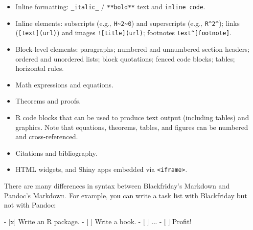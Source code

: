 \documentclass[12pt,]{krantz}
\makeatletter
\newenvironment{Shaded}{\begin{snugshade}}{\end{snugshade}}
\newcommand{\FloatTok}[1]{\textcolor[rgb]{0.00,0.00,0.81}{#1}}
\newcommand{\NormalTok}[1]{#1}
\newenvironment{kframe}{%
\medskip{}
\setlength{\fboxsep}{.8em}
 \def\at@end@of@kframe{}%
 \ifinner\ifhmode%
  \def\at@end@of@kframe{\end{minipage}}%
  \begin{minipage}{\columnwidth}%
 \fi\fi%
 \def\FrameCommand##1{\hskip\@totalleftmargin \hskip-\fboxsep
 \colorbox{shadecolor}{##1}\hskip-\fboxsep
     \hskip-\linewidth \hskip-\@totalleftmargin \hskip\columnwidth}%
 \MakeFramed {\advance\hsize-\width
   \@totalleftmargin\z@ \linewidth\hsize
   \@setminipage}}%
 {\par\unskip\endMakeFramed%
 \at@end@of@kframe}
\renewenvironment{Shaded}{\begin{kframe}}{\end{kframe}}
\theoremstyle{definition}
\theoremstyle{definition}
\theoremstyle{definition}
\theoremstyle{remark}
\makeatother
\begin{document}
\begin{enumerate}
  \begin{itemize}
  \item
    Inline formatting: \texttt{\_italic\_} / \texttt{**bold**} text and
    \texttt{\textasciigrave{}inline\ code\textasciigrave{}}.
  \item
    Inline elements: subscripts (e.g.,
    \texttt{H\textasciitilde{}2\textasciitilde{}0}) and superscripts
    (e.g., \texttt{R\^{}2\^{}}); links (\texttt{{[}text{]}(url)}) and
    images \texttt{!{[}title{]}(url)}; footnotes
    \texttt{text\^{}{[}footnote{]}}.
  \item
    Block-level elements: paragraphs; numbered and unnumbered section
    headers; ordered and unordered lists; block quotations; fenced code
    blocks; tables; horizontal rules.
  \item
    Math expressions and equations.
  \item
    Theorems and proofs.
  \item
    R code blocks that can be used to produce text output (including
    tables) and graphics. Note that equations, theorems, tables, and
    figures can be numbered and cross-referenced.
  \item
    Citations and bibliography.
  \item
    HTML widgets, and Shiny apps embedded via
    \texttt{\textless{}iframe\textgreater{}}.
  \end{itemize}
\end{enumerate}

There are many differences in syntax between Blackfriday's Markdown and
Pandoc's Markdown. For example, you can write a task list with
Blackfriday but not with Pandoc:

\begin{Shaded}
\begin{Highlighting}[]
\NormalTok{- }\FloatTok{[x] Write an R package.}
\FloatTok{- [ ] Write a book.}
\FloatTok{- [ ] ...}
\FloatTok{- [ ] Profit!}
\end{Highlighting}
\end{Shaded}
\end{document}
